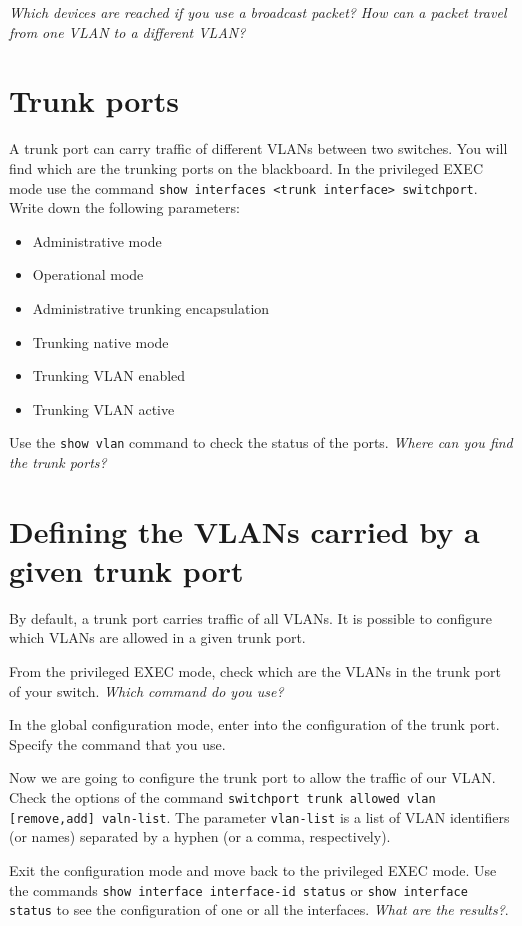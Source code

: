 \emph{Which devices are reached if you use a broadcast packet?}
\emph{How can a packet travel from one VLAN to a different VLAN?}

\section{Trunk ports}

A trunk port can carry traffic of different VLANs between two switches.
You will find which are the trunking ports on the blackboard.
In the privileged EXEC mode use the command \texttt{show interfaces <trunk interface> switchport}.
Write down the following parameters:
\begin{itemize}
\item Administrative mode
\item Operational mode
\item Administrative trunking encapsulation
\item Trunking native mode
\item Trunking VLAN enabled
\item Trunking VLAN active
\end{itemize}

Use the \texttt{show vlan} command to check the status of the ports.
\emph{Where can you find the trunk ports?}

\section{Defining the VLANs carried by a given trunk port}

By default, a trunk port carries traffic of all VLANs.
It is possible to configure which VLANs are allowed in a given trunk port.

From the privileged EXEC mode, check which are the VLANs in the trunk port of your switch.
\emph{Which command do you use?}

In the global configuration mode, enter into the configuration of the trunk port.
Specify the command that you use.

Now we are going to configure the trunk port to allow the traffic of our VLAN.
Check the options of the command \texttt{switchport trunk allowed vlan [remove,add] valn-list}.
The parameter \texttt{vlan-list} is a list of VLAN identifiers (or names) separated by a  hyphen (or a comma, respectively).

Exit the configuration mode and move back to the privileged EXEC mode.
Use the commands \texttt{show interface interface-id status} or \texttt{show interface status} to see the configuration of one or all the interfaces.
\emph{What are the results?}.

